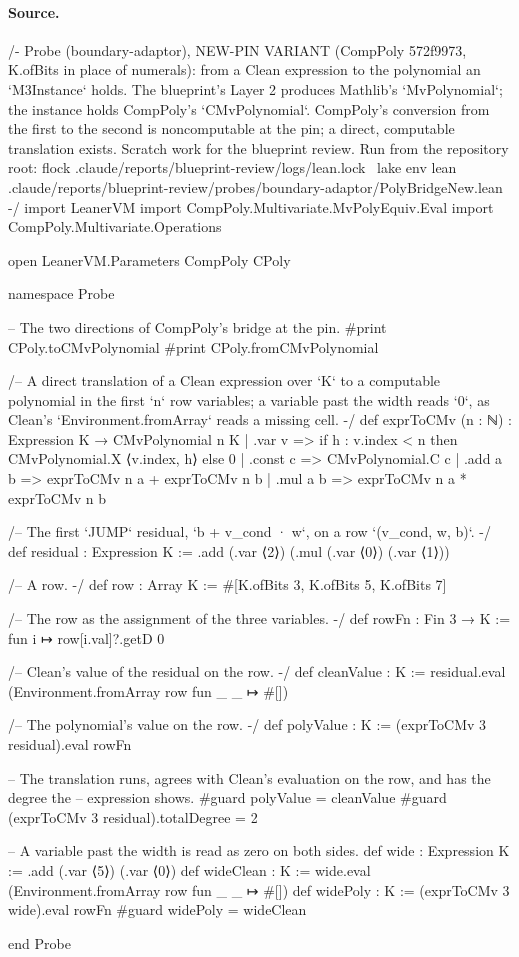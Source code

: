 \paragraph{Source.}
\begin{leancode}[numbers=left,numbersep=3pt]
/-
  Probe (boundary-adaptor), NEW-PIN VARIANT (CompPoly 572f9973, K.ofBits in place of numerals): from a Clean expression to the polynomial an `M3Instance` holds.
  The blueprint's Layer 2 produces Mathlib's `MvPolynomial`; the instance holds CompPoly's
  `CMvPolynomial`. CompPoly's conversion from the first to the second is noncomputable at the
  pin; a direct, computable translation exists. Scratch work for the blueprint review.
  Run from the repository root:
    flock .claude/reports/blueprint-review/logs/lean.lock \
      lake env lean .claude/reports/blueprint-review/probes/boundary-adaptor/PolyBridgeNew.lean
-/
import LeanerVM
import CompPoly.Multivariate.MvPolyEquiv.Eval
import CompPoly.Multivariate.Operations

open LeanerVM.Parameters CompPoly CPoly

namespace Probe

-- The two directions of CompPoly's bridge at the pin.
#print CPoly.toCMvPolynomial
#print CPoly.fromCMvPolynomial

/-- A direct translation of a Clean expression over `K` to a computable polynomial in the first
`n` row variables; a variable past the width reads `0`, as Clean's `Environment.fromArray`
reads a missing cell. -/
def exprToCMv (n : ℕ) : Expression K → CMvPolynomial n K
  | .var v => if h : v.index < n then CMvPolynomial.X ⟨v.index, h⟩ else 0
  | .const c => CMvPolynomial.C c
  | .add a b => exprToCMv n a + exprToCMv n b
  | .mul a b => exprToCMv n a * exprToCMv n b

/-- The first `JUMP` residual, `b + v_cond · w`, on a row `(v_cond, w, b)`. -/
def residual : Expression K := .add (.var ⟨2⟩) (.mul (.var ⟨0⟩) (.var ⟨1⟩))

/-- A row. -/
def row : Array K := #[K.ofBits 3, K.ofBits 5, K.ofBits 7]

/-- The row as the assignment of the three variables. -/
def rowFn : Fin 3 → K := fun i ↦ row[i.val]?.getD 0

/-- Clean's value of the residual on the row. -/
def cleanValue : K := residual.eval (Environment.fromArray row fun _ _ ↦ #[])

/-- The polynomial's value on the row. -/
def polyValue : K := (exprToCMv 3 residual).eval rowFn

-- The translation runs, agrees with Clean's evaluation on the row, and has the degree the
-- expression shows.
#guard polyValue = cleanValue
#guard (exprToCMv 3 residual).totalDegree = 2

-- A variable past the width is read as zero on both sides.
def wide : Expression K := .add (.var ⟨5⟩) (.var ⟨0⟩)
def wideClean : K := wide.eval (Environment.fromArray row fun _ _ ↦ #[])
def widePoly : K := (exprToCMv 3 wide).eval rowFn
#guard widePoly = wideClean

end Probe
\end{leancode}

